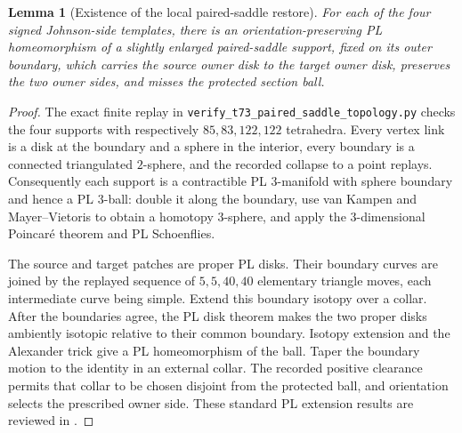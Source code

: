 \documentclass[11pt]{amsart}
\newtheorem{lemma}[theorem]{Lemma}
\theoremstyle{definition}
\theoremstyle{remark}
\begin{document}
\begin{lemma}[Existence of the local paired-saddle restore]
\label{lem:paired-saddle-existence}
For each of the four signed Johnson-side templates, there is an
orientation-preserving PL homeomorphism of a slightly enlarged paired-saddle
support, fixed on its outer boundary, which carries the source owner disk to
the target owner disk, preserves the two owner sides, and misses the protected
section ball.
\end{lemma}

\begin{proof}
The exact finite replay in
\texttt{verify\_t73\_paired\_saddle\_topology.py} checks the four supports
with respectively $85,83,122,122$ tetrahedra.  Every vertex link is a disk at
the boundary and a sphere in the interior, every boundary is a connected
triangulated $2$-sphere, and the recorded collapse to a point replays.
Consequently each support is a contractible PL $3$-manifold with sphere
boundary and hence a PL $3$-ball: double it along the boundary, use van Kampen
and Mayer--Vietoris to obtain a homotopy $3$-sphere, and apply the
$3$-dimensional Poincar\'e theorem and PL Schoenflies.

The source and target patches are proper PL disks.  Their boundary curves are
joined by the replayed sequence of $5,5,40,40$ elementary triangle moves,
each intermediate curve being simple.  Extend this boundary isotopy over a
collar.  After the boundaries agree, the PL disk theorem makes the two proper
disks ambiently isotopic relative to their common boundary.  Isotopy extension
and the Alexander trick give a PL homeomorphism of the ball.  Taper the
boundary motion to the identity in an external collar.  The recorded positive
clearance permits that collar to be chosen disjoint from the protected ball,
and orientation selects the prescribed owner side.  These standard PL
extension results are reviewed in \cite{RourkeSanderson1972}.
\end{proof}
\end{document}
